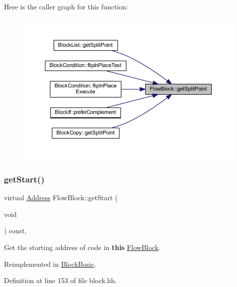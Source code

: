 Here is the caller graph for this function\+:
\nopagebreak
\begin{figure}[H]
\begin{center}
\leavevmode
\includegraphics[width=350pt]{class_flow_block_a20996aacbad259e2e4a7bb0c72482335_icgraph}
\end{center}
\end{figure}
\mbox{\label{class_flow_block_a4e2f7c4ce119ccb628c2609bc3a5b842}} 
\subsubsection{\texorpdfstring{getStart()}{getStart()}}
{\footnotesize\ttfamily virtual \mbox{\hyperlink{class_address}{Address}} Flow\+Block\+::get\+Start (\begin{DoxyParamCaption}\item[{void}]{ }\end{DoxyParamCaption}) const\hspace{0.3cm}{\ttfamily [inline]}, {\ttfamily [virtual]}}



Get the starting address of code in {\bfseries{this}} \mbox{\hyperlink{class_flow_block}{Flow\+Block}}. 



Reimplemented in \mbox{\hyperlink{class_block_basic_a779d71352d86f6af4342b419713c03d5}{Block\+Basic}}.



Definition at line 153 of file block.\+hh.

